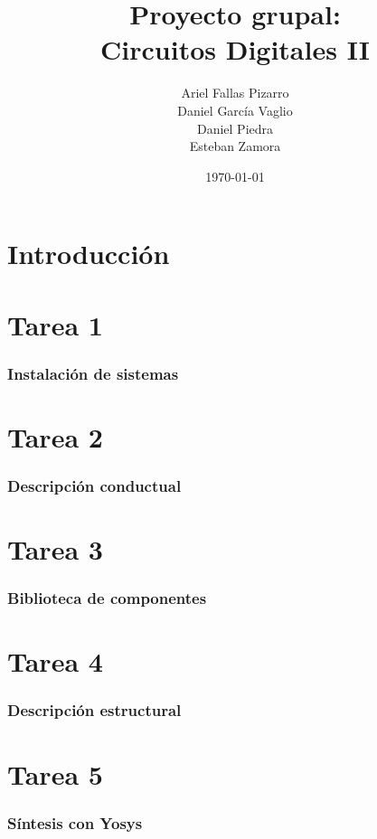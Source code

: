\documentclass{beamer}
\title[Proyecto 0]{{\tiny Proyecto grupal:}\\ Circuitos Digitales II} %
\author{Ariel Fallas Pizarro \\Daniel García Vaglio\\Daniel Piedra \\Esteban Zamora} %
\institute[UCR] %
{
Universdad de Costa Rica \\ %
\medskip
}
\date{\today} %
\begin{document}
\begin{frame}
\titlepage %
\end{frame}




\section{Introducción} %
\section{Tarea 1}
\begin{frame}
\frametitle{Instalación de sistemas}

\end{frame}




\section{Tarea 2}
\begin{frame}
\frametitle{Descripción conductual}

\end{frame}

\section{Tarea 3}
\begin{frame}
\frametitle{Biblioteca de componentes}

\end{frame}


\section{Tarea 4}

\begin{frame}
\frametitle{Descripción estructural}

	
\end{frame}

\section{Tarea 5}



\begin{frame}
\frametitle{Síntesis con Yosys}

\end{frame}
\end{document}
